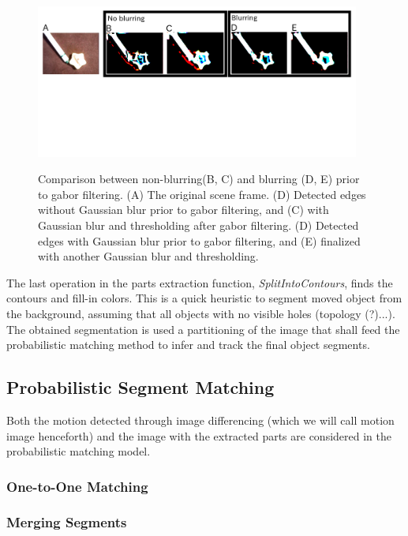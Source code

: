 \documentclass{article}
\begin{document}
\begin{figure}[tbp]
\begin{center}
\caption{Comparison between non-blurring(B, C) and blurring (D, E) prior to gabor filtering. (A) The original scene frame.  (D) Detected edges without Gaussian blur prior to gabor filtering, and (C) with Gaussian blur and thresholding after gabor filtering. (D) Detected edges with Gaussian blur prior to gabor filtering, and (E) finalized with another Gaussian blur and thresholding.}
  \includegraphics[width=0.95\textwidth]{2}
\label{figure:gaussian_blur}
\end{center}
\end{figure}


The last operation in the parts extraction function, \emph{SplitIntoContours}, finds the contours and fill-in colors. This is a quick heuristic to segment moved object from the background, assuming that all objects with no visible holes (topology (?)...). The obtained segmentation is used a partitioning of the image that shall feed the probabilistic matching method to infer and track the final object segments. 

\subsection{Probabilistic Segment Matching}

Both the motion detected through image differencing (which we will call motion image henceforth) and the image with the extracted parts are considered in the probabilistic matching model. 

\subsubsection{One-to-One Matching}

\subsubsection{Merging Segments}
\end{document}
